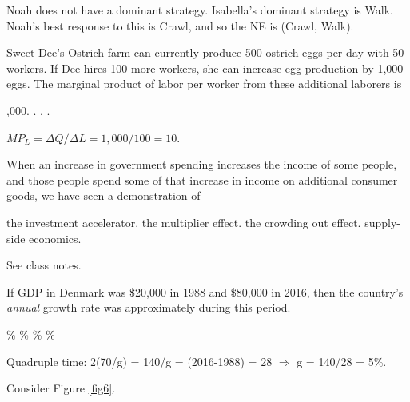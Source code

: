 \documentclass[addpoints,11pt]{exam}
\theoremstyle{definition}
\newcommand{\blank}[0]{\underline{\hspace{3cm}}}
\begin{document}
\begin{questions}
\begin{solution}
Noah does not have a dominant strategy. Isabella's dominant strategy is Walk. Noah's best response to this is Crawl, and so the NE is (Crawl, Walk).
\end{solution}

\question Sweet Dee's Ostrich farm can currently produce 500 ostrich eggs per day with 50 workers. If Dee hires 100 more workers, she can increase egg production by 1,000 eggs. The marginal product of labor per worker from these additional laborers is

\begin{choices}
,000.
.
.
.
\end{choices}

\begin{solution}
$MP_L = \Delta Q/\Delta L = 1,000/100 = 10$.
\end{solution}

\question When an increase in government spending increases the income of some people, and those people spend some of that increase in income on additional consumer goods, we have seen a demonstration of 

\begin{choices}
\choice the investment accelerator. 
\CorrectChoice the multiplier effect.
\choice the crowding out effect.
\choice supply-side economics.
\end{choices}

\begin{solution}
See class notes.
\end{solution}

\question If GDP in Denmark was \$20,000 in 1988 and \$80,000 in 2016, then the country's \textit{annual} growth rate was approximately \blank during this period.

\begin{choices}
\%
\%
\%
\%
\end{choices}

\begin{solution}
Quadruple time: 2(70/g) = 140/g = (2016-1988) = 28 $\Rightarrow$ g = 140/28 = 5\%.
\end{solution}

\newpage

\question Consider Figure \ref{fig6}.



\end{questions}
\end{document}

